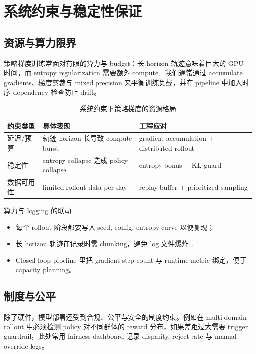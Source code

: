 \section{系统约束与稳定性保证}
\subsection{资源与算力限界}
策略梯度训练常面对有限的算力与 budget：长 horizon 轨迹意味着巨大的 GPU 时间，而 entropy regularization 需要额外 compute。我们通常通过 accumulate gradients、梯度剪裁与 mixed precision 来平衡训练负载，并在 pipeline 中加入时序 dependency 检查防止 drift。

\begin{table}[H]
\centering
\small
\begin{tabular}{p{}p{}p{}}
\toprule
约束类型 & 具体表现 & 工程应对 \\
\midrule
延迟/预算 & 轨迹 horizon 长导致 compute burst & gradient accumulation + distributed rollout \\
稳定性 & entropy collapse 造成 policy collapse & entropy bonus + KL guard \\
数据可用性 & limited rollout data per day & replay buffer + prioritized sampling \\
\bottomrule
\end{tabular}
\caption{系统约束下策略梯度的资源格局}
\end{table}

\begin{importantbox}{算力与 logging 的联动}
\begin{itemize}
    \item 每个 rollout 阶段都要写入 seed, config, entropy curve 以便复现；
    \item 长 horizon 轨迹在记录时需 chunking，避免 log 文件爆炸；
    \item Closed-loop pipeline 里把 gradient step count 与 runtime metric 绑定，便于 capacity planning。
\end{itemize}
\end{importantbox}

\subsection{制度与公平}
除了硬件，模型部署还受到合规、公平与安全的制度约束。例如在 multi-domain rollout 中必须检测 policy 对不同群体的 reward 分布，如果差距过大需要 trigger guardrail。此处常用 fairness dashboard 记录 disparity, reject rate 与 manual override logs。

